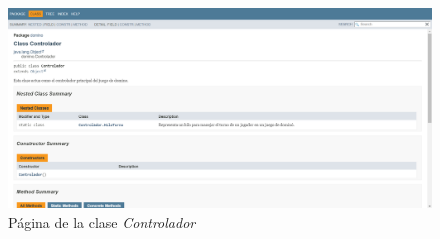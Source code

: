 \documentclass[12pt]{article}
\begin{document}
  \begin{figure}[h!]
    \centering
    \includegraphics[width=\textwidth]{doc4.png}
    \caption{Página de la clase \textit{Controlador}} 
  \end{figure}
\end{document}

